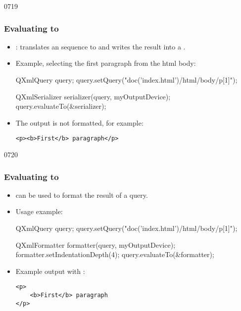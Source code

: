 \begin{slide}[fragile]{0719}
\frametitle{Evaluating to }
\begin{itemize}
\item {}: translates an  sequence to  and writes the result into a . 
\item Example, selecting the first paragraph from the html body:
\begin{cpp}
QXmlQuery query;
query.setQuery("doc('index.html')/html/body/p[1]");

QXmlSerializer serializer(query, myOutputDevice);
query.evaluateTo(&serializer);
\end{cpp}
\item The output is not formatted, for example:
\begin{verbatim}
<p><b>First</b> paragraph</p>
\end{verbatim}
\end{itemize}
\end{slide}


\begin{slide}[fragile]{0720}
\frametitle{Evaluating to }
\begin{itemize}
\item {} can be used to format the result of a query.
\item Usage example:
\begin{cpp}
QXmlQuery query;
query.setQuery("doc('index.html')/html/body/p[1]");

QXmlFormatter formatter(query, myOutputDevice);
formatter.setIndentationDepth(4);
query.evaluateTo(&formatter);
\end{cpp}
\item Example output with :
\begin{verbatim}
<p>
    <b>First</b> paragraph
</p>
\end{verbatim}
\end{itemize}
\end{slide}
